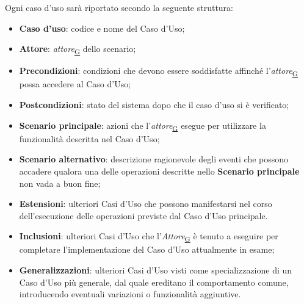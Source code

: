 ﻿\documentclass[a4paper,12pt]{article}
\begin{document}
{{      Ogni caso d'uso sarà riportato secondo la seguente struttura:
      \begin{itemize}
          \item \textbf{Caso d'uso}: codice e nome del Caso d'Uso;
          \item \textbf{Attore}: \textit{attore}\textsubscript{\href{https://atlasteam9.github.io/Atlas/glossario.html\#Attore}{G}} dello scenario;
          \item \textbf{Precondizioni}: condizioni che devono essere soddisfatte affinché l'\textit{attore}\textsubscript{\href{https://atlasteam9.github.io/Atlas/glossario.html\#Attore}{G}} possa accedere al Caso d'Uso;
          \item \textbf{Postcondizioni}: stato del sistema dopo che il caso d'uso si è verificato;
          \item \textbf{Scenario principale}: azioni che l'\textit{attore}\textsubscript{\href{https://atlasteam9.github.io/Atlas/glossario.html\#Attore}{G}} esegue per utilizzare la funzionalità descritta nel Caso d'Uso;
          \item \textbf{Scenario alternativo}: descrizione ragionevole degli eventi che possono accadere qualora una delle operazioni descritte nello \textbf{Scenario principale} non vada a buon fine;
          \item \textbf{Estensioni}: ulteriori Casi d'Uso che possono manifestarsi nel corso dell'esecuzione delle operazioni previste dal Caso d'Uso principale.
          \item \textbf{Inclusioni}: ulteriori Casi d'Uso che l'\textit{Attore}\textsubscript{\href{https://atlasteam9.github.io/Atlas/glossario.html\#Attore}{G}} è tenuto a eseguire per completare l'implementazione del Caso d'Uso attualmente in esame;
          \item \textbf{Generalizzazioni}: ulteriori Casi d'Uso visti come specializzazione di un Caso d'Uso più generale, dal quale ereditano il comportamento comune, introducendo eventuali variazioni o funzionalità aggiuntive.
      \end{itemize}

}}
\end{document}
